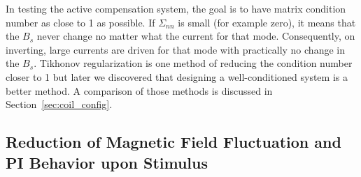 
In testing the active compensation system, the goal is to have matrix condition number as close to 1 as possible. If $\Sigma_{nn}$ is small (for example zero), it means that the $B_s$ never change no matter what the current for that mode. Consequently, on inverting, large currents are driven for that mode with practically no change in the $B_s$. Tikhonov regularization is one method of reducing the condition number closer to 1 but later we discovered that designing a well-conditioned system is a better method. A comparison of those methods is discussed in Section~\ref{sec:coil_config}.


\subsection{Reduction of Magnetic Field Fluctuation and PI Behavior upon Stimulus}


